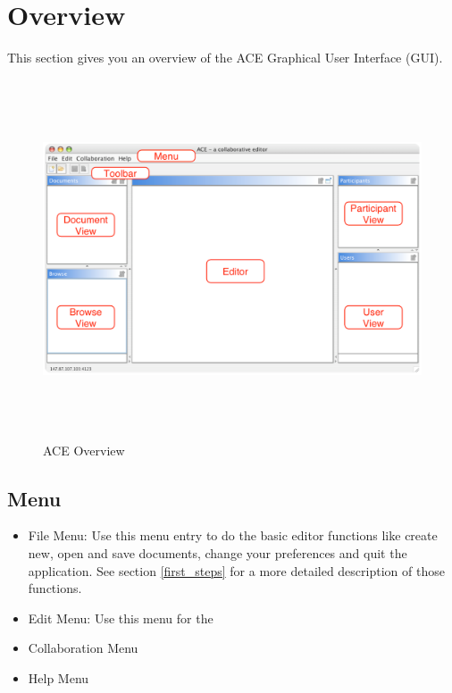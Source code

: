 \documentclass[11pt,a4paper]{article}
\begin{document}
\newpage
\section{Overview}
This section gives you an overview of the ACE Graphical User Interface (GUI). 

\begin{figure}[H]
\begin{center}
  \includegraphics[height=4.18in, width=6.68in]{../images/usermanual/g_ace_overview.eps}
\caption{ACE Overview}
\label{default}
\end{center}
\end{figure}

\subsection{Menu}
\begin{itemize}
\item File Menu: Use this menu entry to do the basic editor functions like create new, open and save documents, change your preferences and quit the application. See section \ref{first_steps} for a more detailed description of those functions.
\item Edit Menu: Use this menu for the 
\item Collaboration Menu
\item Help Menu
\end{itemize}

\end{document}
